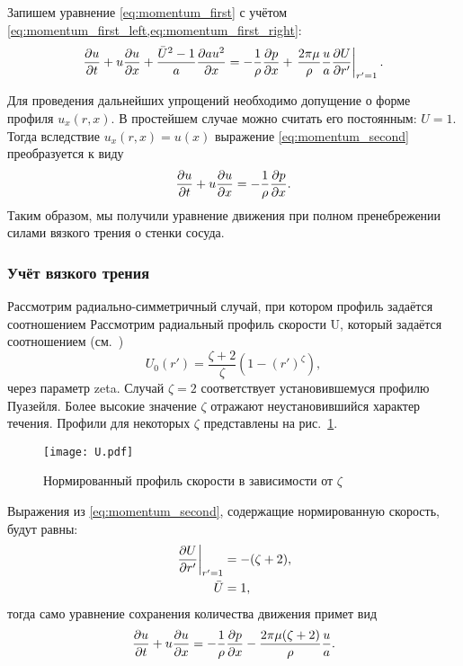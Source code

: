 Запишем уравнение \cref{eq:momentum_first} с учётом \cref{eq:momentum_first_left,eq:momentum_first_right}:
\begin{equation}
\label{eq:momentum_second}
\frac{\partial u}{\partial t} + u\frac{\partial u}{\partial x} + \frac{\bar U^2 - 1}{a}\frac{\partial a u^2}{\partial x} =
	-\frac{1}{\rho} \frac{\partial p}{\partial x} + \left.\frac{2\pi\mu}{\rho}\frac{u}{a}\frac{\partial U}{\partial r'}\right|_{r'=1}.
\end{equation}

Для проведения дальнейших упрощений необходимо допущение о форме профиля $u_x(r, x)$.
В простейшем случае можно считать его постоянным: $U=1$. Тогда вследствие $u_x(r, x) = u(x)$
выражение \cref{eq:momentum_second} преобразуется к виду
\begin{equation}
\label{eq:momentum_conservation_inviscid}
\frac{\partial u}{\partial t} + u\frac{\partial u}{\partial x} = -\frac{1}{\rho} \frac{\partial p}{\partial x}.
\end{equation}
Таким образом, мы получили уравнение движения при полном пренебрежении
силами вязкого трения о стенки сосуда.

\subsubsection{Учёт вязкого трения}
Рассмотрим радиально-симметричный случай, при котором профиль задаётся соотношением
Рассмотрим радиальный профиль скорости \gls{U}, который задаётся соотношением (см.~\cite{Hughes1973,Smith2001})
\begin{equation}
U_0(r') = \frac{\zeta+2}{\zeta} \left(1 - \left(r'\right)^{\zeta}\right),
\end{equation}
через параметр \gls{zeta}. Случай $\zeta=2$ соответствует установившемуся профилю Пуазейля.
Более высокие значение $\zeta$ отражают неустановившийся характер течения.
Профили для некоторых $\zeta$ представлены на рис.~\ref{fig:U}.


\begin{figure}[h]
    \centering
    \texttt{[image: U.pdf]}
    \caption{Нормированный профиль скорости в зависимости от $\zeta$}
    \label{fig:U}
\end{figure}

Выражения из \cref{eq:momentum_second}, содержащие нормированную скорость, будут равны:
\begin{align*}
\left.\frac{\partial U}{\partial r'}\right|_{r'=1} &= - (\zeta+2),\\
\bar U &= 1,
\end{align*}
тогда само уравнение сохранения количества движения примет вид
\begin{equation}
\label{eq:momentum_conservation_viscous}
\frac{\partial u}{\partial t} + u\frac{\partial u}{\partial x} =
	-\frac{1}{\rho} \frac{\partial p}{\partial x} - \frac{2\pi\mu(\zeta+2)}{\rho}\frac{u}{a}.
\end{equation}

